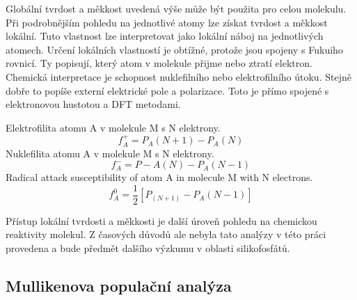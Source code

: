 \documentclass[
  digital, %
  table,   %
  lof,     %
  lot,     %
  oneside,
]{fithesis3}
\begin{document}
Globální tvrdost a měkkost uvedená výše může být použita pro celou molekulu. Při podrobnějším pohledu na jednotlivé atomy lze získat tvrdost a měkkost lokální. Tuto vlastnost lze interpretovat jako lokální náboj na jednotlivých atomech. Určení lokálních vlastností je obtížné, protože jsou spojeny s Fukuiho rovnicí. Ty popisují, který atom v molekule přijme nebo ztratí elektron. Chemická interpretace je schopnost nuklefilního nebo elektrofilního útoku. Stejně dobře to popíše externí elektrické pole a polarizace. Toto je přímo spojené s elektronovou hustotou a DFT metodami.

Elektrofilita atomu A v molekule M s N elektrony.
\begin{equation}
f_A^+ = P_A(N+1) - P_A(N)
\end{equation}
Nuklefilita atomu A v molekule M s N elektrony.
\begin{equation}
f_A^- = P-A(N) - P_A(N-1)
\end{equation}
Radical attack susceptibility of atom A in molecule M with N electrons.
\begin{equation}
f_A^0 = \frac{1}{2}[P_(N+1) - P_A(N-1)]
\end{equation}

Přístup lokální tvrdosti a měkkosti je další úroveň pohledu na chemickou reaktivity molekul. Z časových důvodů ale nebyla tato analýzy v této práci provedena a bude předmět dalšího výzkumu v oblasti silikofosfátů.

\subsection{Mullikenova populační analýza}
\end{document}
